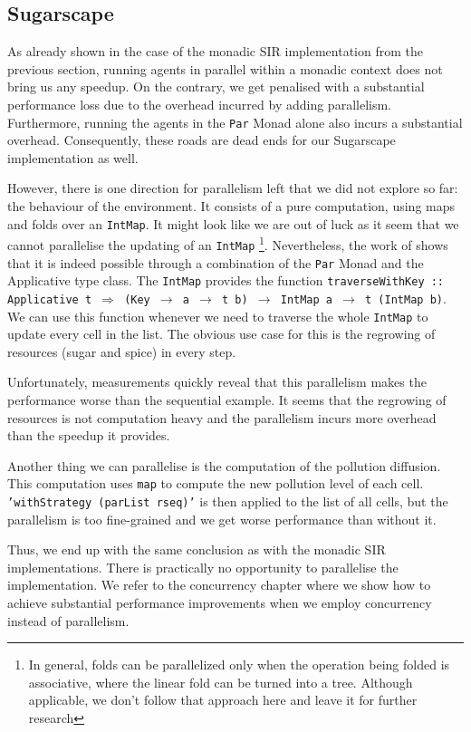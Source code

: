 \subsection{Sugarscape}
As already shown in the case of the monadic SIR implementation from the previous section, running agents in parallel within a monadic context does not bring us any speedup. On the contrary, we get penalised with a substantial performance loss due to the overhead incurred by adding parallelism. Furthermore, running the agents in the \texttt{Par} Monad alone also incurs a substantial overhead. Consequently, these roads are dead ends for our Sugarscape implementation as well.

However, there is one direction for parallelism left that we did not explore so far: the behaviour of the environment. It consists of a pure computation, using maps and folds over an \texttt{IntMap}. It might look like we are out of luck as it seem that we cannot parallelise the updating of an \texttt{IntMap} \footnote{In general, folds can be parallelized only when the operation being folded is associative, where the linear fold can be turned into a tree. Although applicable, we don't follow that approach here and leave it for further research}. Nevertheless, the work of \cite{marlow_parallel_2013} shows that it is indeed possible through a combination of the \texttt{Par} Monad and the Applicative type class. The \texttt{IntMap} provides the function \texttt{traverseWithKey :: Applicative t $\Rightarrow$ (Key $\rightarrow$ a $\rightarrow$ t b) $\rightarrow$ IntMap a $\rightarrow$ t (IntMap b)}. We can use this function whenever we need to traverse the whole \texttt{IntMap} to update every cell in the list. The obvious use case for this is the regrowing of resources (sugar and spice) in every step.

Unfortunately, measurements quickly reveal that this parallelism makes the performance worse than the sequential example. It seems that the regrowing of resources is not computation heavy and the parallelism incurs more overhead than the speedup it provides.

Another thing we can parallelise is the computation of the pollution diffusion. This computation uses \texttt{map} to compute the new pollution level of each cell. \texttt{'withStrategy (parList rseq)'} is then applied to the list of all cells, but the parallelism is too fine-grained and we get worse performance than without it.

Thus, we end up with the same conclusion as with the monadic SIR implementations. There is practically no opportunity to parallelise the implementation. We refer to the concurrency chapter where we show how to achieve substantial performance improvements when we employ concurrency instead of parallelism.